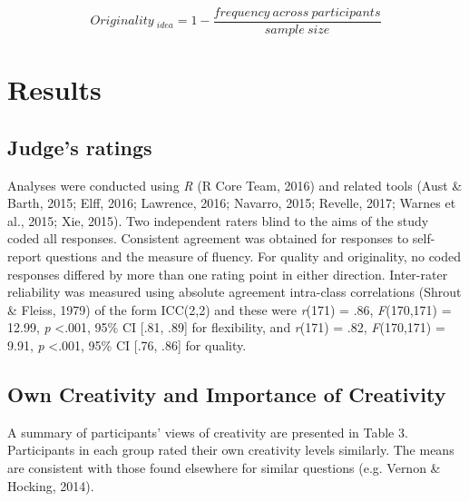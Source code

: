 \documentclass[english,man]{apa6}
\begin{document}
\[Originality\ _{idea}=1-\frac{frequency\ across\ participants}{sample\ size}\]

\hypertarget{results}{%
\section{Results}\label{results}}

\hypertarget{judges-ratings}{%
\subsection{Judge's ratings}\label{judges-ratings}}

Analyses were conducted using \emph{R} (R Core Team, 2016) and related
tools (Aust \& Barth, 2015; Elff, 2016; Lawrence, 2016; Navarro, 2015;
Revelle, 2017; Warnes et al., 2015; Xie, 2015). Two independent raters
blind to the aims of the study coded all responses. Consistent agreement
was obtained for responses to self-report questions and the measure of
fluency. For quality and originality, no coded responses differed by
more than one rating point in either direction. Inter-rater reliability
was measured using absolute agreement intra-class correlations (Shrout
\& Fleiss, 1979) of the form ICC(2,2) and these were \emph{r}(171) =
.86, \emph{F}(170,171) = 12.99, \emph{p} \textless{}.001, 95\% CI
{[}.81, .89{]} for flexibility, and \emph{r}(171) = .82,
\emph{F}(170,171) = 9.91, \emph{p} \textless{}.001, 95\% CI {[}.76,
.86{]} for quality.

\hypertarget{own-creativity-and-importance-of-creativity}{%
\subsection{Own Creativity and Importance of
Creativity}\label{own-creativity-and-importance-of-creativity}}

A summary of participants' views of creativity are presented in Table 3.
Participants in each group rated their own creativity levels similarly.
The means are consistent with those found elsewhere for similar
questions (e.g. Vernon \& Hocking, 2014).
\end{document}
